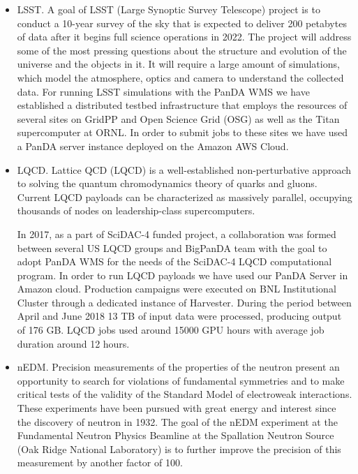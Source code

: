 \begin{itemize}
    \item LSST.
A goal of LSST (Large Synoptic Survey Telescope) project is to conduct a
10-year survey of the sky that is expected to deliver 200 petabytes of data
after it begins full science operations in 2022. The project  will address some
of the most pressing questions about the structure and evolution of the
universe and the objects in it. It will require a large amount of simulations,
which model the atmosphere, optics and camera to understand the collected data.
For running LSST simulations with the PanDA WMS we have established a
distributed testbed infrastructure that employs the resources of several sites
        on GridPP \cite{0954-3899-32-1-N01} and Open Science Grid (OSG) \cite{1742-6596-78-1-012057} as well as the Titan
supercomputer at ORNL. In order to submit jobs to these sites we have used a
PanDA server instance deployed on the Amazon AWS Cloud.

    \item LQCD.
Lattice QCD (LQCD) \cite{Babich:2010:PQL:1884643.1884695} is a well-established 
non-perturbative approach to solving the quantum chromodynamics theory of quarks 
and gluons.  Current LQCD payloads can be characterized as massively parallel, 
occupying thousands of nodes on leadership-class supercomputers.

In 2017, as a part of SciDAC-4 funded project, a collaboration was formed between 
several US LQCD groups and BigPanDA team with the goal to adopt PanDA WMS for the 
needs of the SciDAC-4 LQCD computational program.
In order to run LQCD payloads we have used our PanDA Server in Amazon cloud. 
Production campaigns were executed on BNL Institutional Cluster through a 
dedicated instance of Harvester. During the period between April and June 2018 13 TB 
of input data were processed, producing output of 176 GB. LQCD jobs used around 
15000 GPU hours with average job duration around 12 hours.

    \item nEDM.
Precision measurements of the properties of the neutron present an opportunity
to search for violations of fundamental symmetries and to make critical tests
of the validity of the Standard Model of electroweak interactions. These
experiments have been pursued \cite{Sakharov:1967dj} with great energy and interest since
the discovery of neutron in 1932. The goal of the nEDM \cite{0954-3899-36-10-104002} experiment at the
Fundamental Neutron Physics Beamline at the Spallation Neutron Source (Oak
Ridge National Laboratory) is to further improve the precision of this
measurement by another factor of 100.
\end{itemize}

